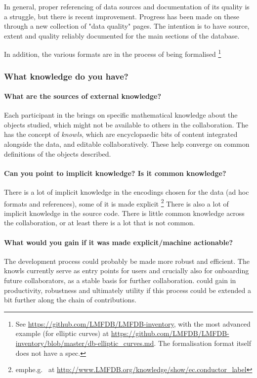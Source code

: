 In general, proper referencing of data sources and documentation of its quality is a struggle, but there is recent improvement. 
Progress has been made on these through a new collection of "data quality" pages. The intention is to have source, extent and quality reliably documented for the main sections of the database.

In addition, the various formats are in the process of being formalised \footnote{See \url{https://github.com/LMFDB/LMFDB-inventory}, with the most advanced example (for elliptic curves) at \url{https://github.com/LMFDB/LMFDB-inventory/blob/master/db-elliptic_curves.md}. The formalisation format itself does not have a spec.}



\subsubsection{What knowledge do you have?}
\paragraph{What are the sources of external knowledge?}
Each participant in the \LMFDB brings on specific mathematical knowledge about the objects studied, which might not be available to others in the collaboration. The \LMFDB has the concept of \emph{knowls}, which are encyclopaedic bits of content integrated alongside the data, and editable collaboratively. These help converge on common definitions of the objects described. 

\paragraph{Can you point to implicit knowledge? Is it common knowledge?}
There is a lot of implicit knowledge in the encodings chosen for the data (ad hoc formats and references), some of it is made explicit \footnote{emph{e.g.}~ at \url{http://www.LMFDB.org/knowledge/show/ec.conductor_label}}
There is also a lot of implicit knowledge in the source code. There is little common knowledge across the collaboration, or at least there is a lot that is not common.

\paragraph{What would you gain if it was made explicit/machine actionable?}
The development process could probably be made more robust and efficient. The knowls currently serve as entry points for users and crucially also for onboarding future collaborators, as a stable basis for further collaboration. \LMFDB could gain in productivity, robustness and ultimately utility if this process could be extended a bit further along the chain of contributions.

